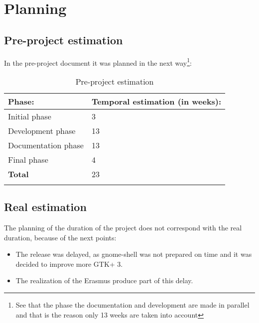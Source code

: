 
\chapter{Planning}

\section{Pre-project estimation}

In the pre-project document it was planned in the next way\footnote{See that the phase the documentation and development are made in parallel and that is the reason only 13 weeks are taken into account}:

\begin{table}[H]
  \begin{center}
    \begin{tabularx}{0.60\textwidth}{|X|X|}
      \firsthline
      \textbf{Phase:} & \textbf{Temporal estimation (in weeks):} \\
      \hline
      Initial phase & 3 \\
      \hline
      Development phase & 13 \\
      \hline
      Documentation phase & 13 \\
      \hline
      Final phase & 4 \\
      \hline
      \textbf{Total} & 23 \\
      \lasthline
    \end{tabularx}
    \caption{Pre-project estimation}
  \end{center}
\end{table}

\newpage
{}

\newpage
{}

\newpage
\section{Real estimation}

The planning of the duration of the project does not correspond with the real duration, because of the next points:
\begin{itemize}
  \item The \GNOME release was delayed, as gnome-shell was not prepared on time and it was decided to improve more GTK+ 3.
  \item The realization of the Erasmus produce part of this delay.
\end{itemize}

